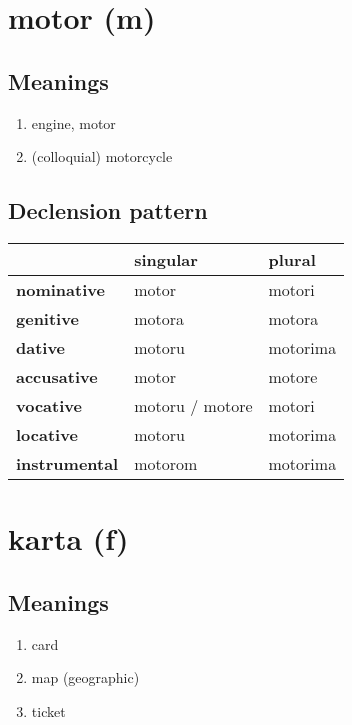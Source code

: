 \filbreak
\section{motor (m)}
\subsection*{Meanings}
\begin{enumerate}
\item engine, motor
\item (colloquial) motorcycle
\end{enumerate}
\subsection*{Declension pattern}
\begin{tabularx}{\linewidth}{Xll}
\toprule
{} &         singular &    plural \\
\midrule
\textbf{nominative  } &            motor &    motori \\
\textbf{genitive    } &           motora &    motora \\
\textbf{dative      } &           motoru &  motorima \\
\textbf{accusative  } &            motor &    motore \\
\textbf{vocative    } &  motoru / motore &    motori \\
\textbf{locative    } &           motoru &  motorima \\
\textbf{instrumental} &          motorom &  motorima \\
\bottomrule
\end{tabularx}

\filbreak
\section{karta (f)}
\subsection*{Meanings}
\begin{enumerate}
\item card
\item map (geographic)
\item ticket
\end{enumerate}
